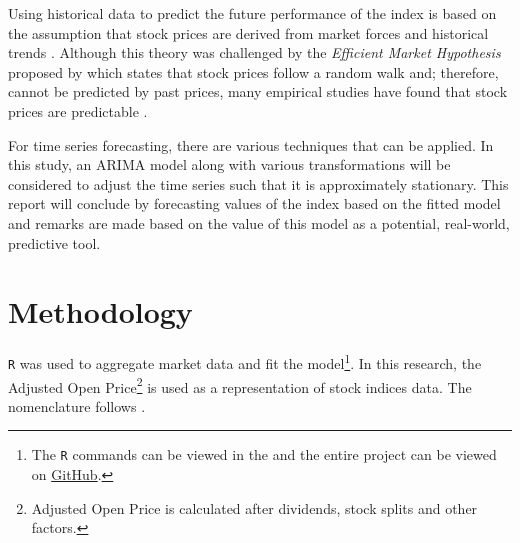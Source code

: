 \documentclass[12pt, centerh1]{article}
\begin{document}
Using historical data to predict the future performance of the index is based on the assumption that stock prices are derived from market forces and historical trends \citep{levy1967relative}. Although this theory was challenged by the \textit{Efficient Market Hypothesis} proposed by \citet{emh} which states that stock prices follow a random walk and; therefore, cannot be predicted by past prices, many empirical studies have found that stock prices are predictable \citep{malkiel2003efficient}.

For time series forecasting, there are various techniques that can be applied. In this study, an ARIMA model along with various transformations will be considered to adjust the time series such that it is approximately stationary. This report will conclude by forecasting values of the index based on the fitted model and remarks are made based on the value of this model as a potential, real-world, predictive tool.

\section{Methodology} \label{methodology}


\texttt{R} \citep{R} was used to aggregate market data and fit the model\footnote{The \texttt{R} commands can be viewed in the  and the entire project can be viewed on \href{https://github.com/grantwforsythe/ARIMA-Model}{GitHub}.}.  In this research, the Adjusted Open Price\footnote{Adjusted Open Price is calculated after dividends, stock splits and other factors.} is used as a representation of stock indices data. The nomenclature follows \citet{cryer2008time}.
\end{document}
